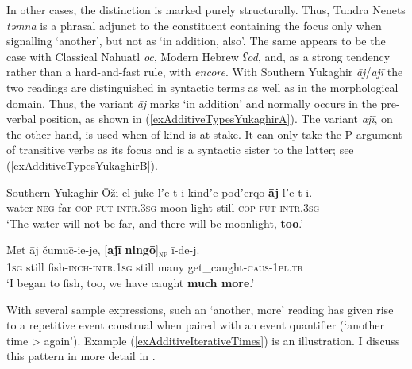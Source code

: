 In other cases, the distinction is marked purely structurally. Thus, Tundra Nenets \textit{təmna} is a phrasal adjunct to the constituent containing the focus only when signalling \lq another\rq{}, but not as \lq in addition, also\rq{}. The same appears to be the case with Classical Nahuatl \textit{oc}, Modern Hebrew \textit{ʕod}, and, as a strong tendency rather than a hard-and-fast rule, with  \textit{encore}. With Southern Yukaghir \textit{āj}/\textit{ajī} the two readings are distinguished in syntactic terms as well as in the morphological domain. Thus, the variant \textit{āj} marks \lq in addition\rq{ }and normally occurs in the pre-verbal position, as shown in (\ref{exAdditiveTypesYukaghirA}). The variant \textit{ajī}, on the other hand, is used when  of kind is at stake. It can only take the P-argument of transitive verbs as its focus and is a syntactic sister to the latter; see (\ref{exAdditiveTypesYukaghirB}). 

\begin{exe}
	\ex 
	\begin{xlist}
		\exi{}Southern Yukaghir
		\ex\label{exAdditiveTypesYukaghirA}
		\gll Ōžī el-jūke lʼe-t-i kindʼe podʼerqo \textbf{āj} lʼe-t-i.\\
	water \textsc{neg}-far \textsc{cop}-\textsc{fut}-\textsc{intr}.3\textsc{sg} moon light still \textsc{cop}-\textsc{fut}-\textsc{intr}.3\textsc{sg}\\
	\glt \lq The water will not be far, and there will be moonlight, \textbf{too}.'

	\ex\label{exAdditiveTypesYukaghirB}
\gll Met āj	čumuc̄-ie-je, \textup{[}\textbf{ajī} \textbf{ningō}\textup{]\textsubscript{\textsc{np}}} ī-de-j.\\
	1\textsc{sg} still fish-\textsc{inch}-\textsc{intr}.1\textsc{sg} \phantom{[}still many get\_caught-\textsc{caus}-1\textsc{pl}.\textsc{tr}\\
	\glt \lq I began to fish, too, we have caught \textbf{much more}.'
	\\\parencite[530, 532]{Maslova2003}
		\end{xlist}
\end{exe}

With several sample expressions, such an \lq another, more\rq{ }reading has given rise to a repetitive event construal when paired with an event quantifier (\lq another time > again\rq{}). Example (\ref{exAdditiveIterativeTimes}) is an illustration. I discuss this pattern in more detail in .

